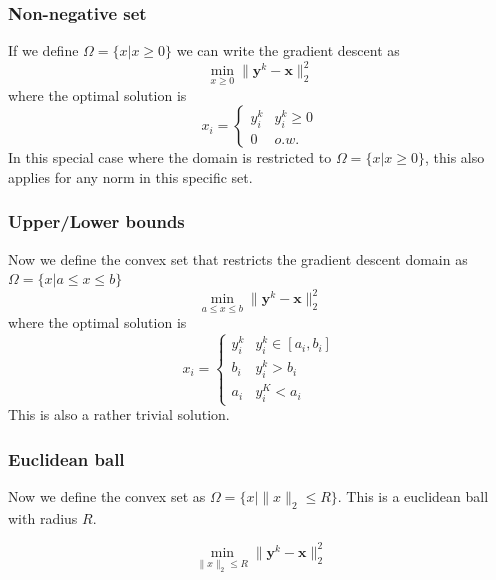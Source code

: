 \subsubsection{Non-negative set}
If we define $\Omega = \{ x | x \geq 0 \}$ we can write the gradient descent as 
\begin{equation}
  \min_{x \geq 0 } \| \textbf{y}^k - \textbf{x}\|_2^2
\end{equation}
where the optimal solution is
\begin{equation}
  x_i = 
  \begin{cases}
    y_i^k & y_i^k \geq 0 \\
    0 & o.w.
  \end{cases}
\end{equation}
In this special case where the domain is restricted to $\Omega = \{ x | x \geq 0 \}$, this also applies for any norm in this specific set.

\subsubsection{Upper/Lower bounds}
Now we define the convex set that restricts the gradient descent domain as $\Omega = \{ x | a \leq x \leq b \}$
\begin{equation}
  \min_{a \leq x \leq b } \| \textbf{y}^k - \textbf{x}\|_2^2
\end{equation}
where the optimal solution is
\begin{equation}
  x_i = 
  \begin{cases}
    y_i^k & y_i^k \in [a_i,b_i] \\
    b_i & y_i^k > b_i \\
    a_i & y_i^K < a_i
  \end{cases}
\end{equation}
This is also a rather trivial solution. 
\subsubsection{Euclidean ball}
Now we define the convex set as $\Omega = \{ x | \| x \|_2 \leq R \}$. This is a euclidean ball with radius $R$.

\begin{equation}
  \min_{\| x \|_2 \leq R} \| \textbf{y}^k - \textbf{x}\|_2^2
\end{equation}

